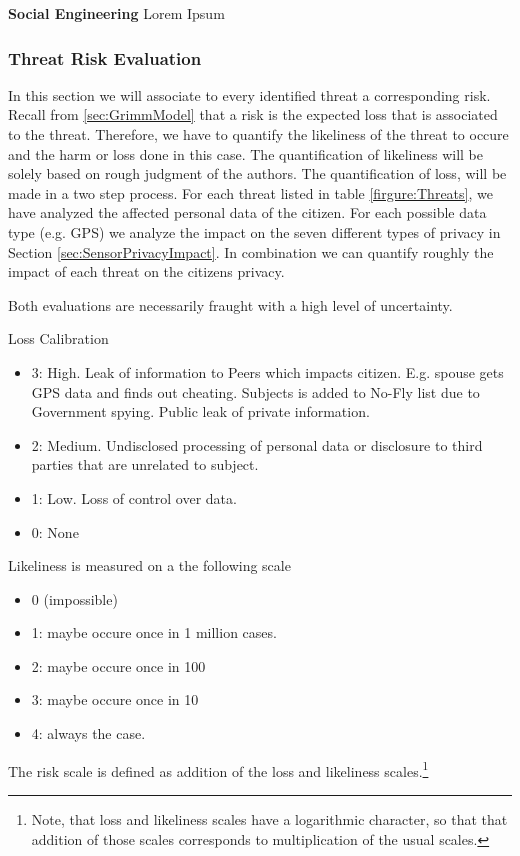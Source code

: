 %
%
%
\textbf{Social Engineering}
Lorem Ipsum


\subsubsection{Threat Risk Evaluation}

In this section we will associate to every identified threat a corresponding risk.
Recall from \ref{sec:GrimmModel} that a risk is the expected loss that is associated to the threat.
Therefore, we have to quantify the likeliness of the threat to occure and the harm or loss done in this case.
The quantification of likeliness will be solely based on rough judgment of the authors.
The quantification of loss, will be made in a two step process.
For each threat listed in table \ref{firgure:Threats}, we have analyzed the affected personal data of the citizen.
For each possible data type (e.g. GPS) we analyze the impact on the seven different types of privacy in Section \ref{sec:SensorPrivacyImpact}.
In combination we can quantify roughly the impact of each threat on the citizens privacy.

Both evaluations are necessarily fraught with a high level of uncertainty.

Loss Calibration
\begin{itemize}
\item 3: High. Leak of information to Peers which impacts citizen.
  E.g. spouse gets GPS data and finds out cheating.
  Subjects is added to No-Fly list due to Government spying.
  Public leak of private information.
\item 2: Medium. Undisclosed processing of personal data or disclosure to third parties that are unrelated to subject.
\item 1: Low. Loss of control over data.
\item 0: None
\end{itemize}

Likeliness is measured on a the following scale
\begin{itemize}
\item 0 (impossible)
\item 1: maybe occure once in 1 million cases.
\item 2: maybe occure once in 100
\item 3: maybe occure once in 10
\item 4: always the case.
\end{itemize}
The risk scale is defined as addition of the loss and likeliness scales.\footnote{
Note, that loss and likeliness scales have a logarithmic character, so that that addition of those scales corresponds to multiplication of the usual scales.
}

